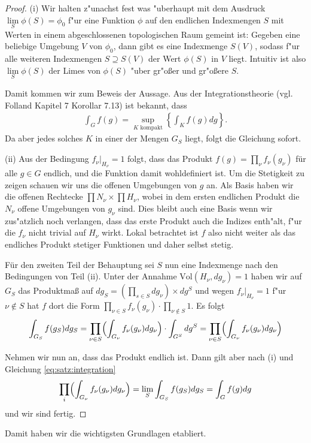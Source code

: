 		\begin{proof}
			(i) Wir halten z"unachst fest was "uberhaupt mit dem Ausdruck $\lim\limits_S \phi(S) = \phi_0$ f"ur eine Funktion $\phi$ auf den endlichen Indexmengen $S$ mit Werten in einem abgeschlossenen topologischen Raum gemeint ist: Gegeben eine beliebige Umgebung $V$ von $\phi_0$, dann gibt es eine Indexmenge $S(V)$, sodass f"ur alle weiteren Indexmengen $S \supseteq S(V)$ der Wert $\phi(S)$ in $V$ liegt. Intuitiv ist also  $\lim\limits_S \phi(S)$ der Limes von $\phi(S)$ "uber gr"oßer und gr"oßere $S$.
			
			Damit kommen wir zum Beweis der Aussage.
			Aus der Integrationstheorie (vgl. Folland \cite{folland} Kapitel 7 Korollar 7.13) ist bekannt, dass 
			\begin{align*}
				\int_{G} f(g) = \sup_{K \text{ kompakt}} \left\{ \int_{K} f(g)dg \right\}.
			\end{align*}
			Da aber jedes solches $K$ in einer der Mengen $G_S$ liegt, folgt die Gleichung sofort.
			
			\noindent(ii) Aus der Bedingung $f_\nu |_{H_\nu} = 1$ folgt, dass das Produkt $f(g) = \prod_{\nu}f_{\nu}(g_\nu)$ für alle $g \in G$ endlich, und die Funktion damit wohldefiniert ist. 
			Um die Stetigkeit zu zeigen schauen wir uns die offenen Umgebungen von $g$ an.
			Als Basis haben wir die offenen Rechtecke $\prod N_\nu \times \prod H_\nu$, wobei in dem ersten endlichen Produkt die $N_\nu$ offene Umgebungen von $g_\nu$ sind.  
			Dies bleibt auch eine Basis wenn wir zus"atzlich noch verlangen, dass das erste Produkt auch die Indizes enth"alt, f"ur die $f_\nu$ nicht trivial auf $H_\nu$ wirkt.
			Lokal betrachtet ist $f$ also nicht weiter als das endliches Produkt stetiger Funktionen und daher selbst stetig.
			
			Für den zweiten Teil der Behauptung sei $S$ nun eine Indexmenge nach den Bedingungen von Teil (ii). 
			Unter der Annahme $\text{Vol}(H_\nu, dg_\nu) = 1$ haben wir auf $G_S$ das Produktmaß auf  $dg_S =\left(\prod_{s \in S}dg_\nu\right) \times dg^S$
			und wegen $f_\nu|_{H_\nu} = 1$ f"ur $\nu \notin S$ hat $f$ dort die Form $\prod_{\nu\in S}f_\nu(g_\nu) \cdot \prod_{\nu\notin S}1$. Es folgt
			\begin{align*}
				\int_{G_S} f(g_S) dg_S = \prod_{\nu\in S}\Bigl(\int_{G_\nu} f_\nu (g_\nu)dg_\nu\Bigr) \cdot \int_{G^S} dg^S = \prod_{\nu\in S}\Bigl(\int_{G_\nu} f_\nu (g_\nu)dg_\nu\Bigr)
			\end{align*}
			
			Nehmen wir nun an, dass das Produkt endlich ist. 
			Dann gilt aber nach (i) und Gleichung \ref{eq:satz:integration}
			\begin{align*}
				\prod_{i}\Bigl(\int_{G_\nu} f_\nu (g_\nu)dg_\nu\Bigr) = \lim_S \int_{G_S} f(g_S) dg_S = \int_{G} f(g) dg
			\end{align*}
			und wir sind fertig.
		\end{proof}
	Damit haben wir die wichtigsten Grundlagen etabliert.